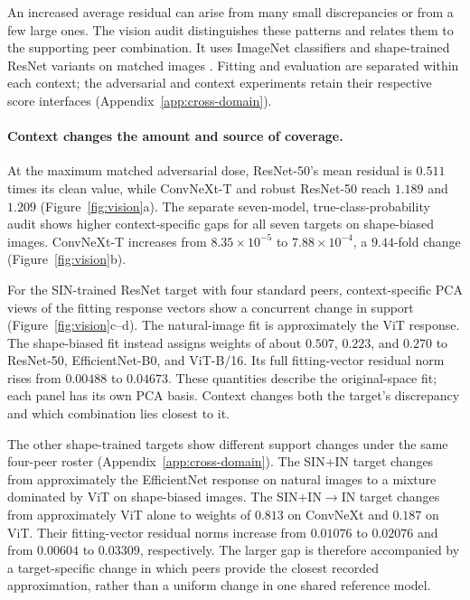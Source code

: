 An increased average residual can arise from many small discrepancies or from a few large ones. The vision audit distinguishes these patterns and relates them to the supporting peer combination. It uses ImageNet classifiers and shape-trained ResNet variants on matched images \citep{deng2009imagenet,he2016resnet,geirhos2019texture}. Fitting and evaluation are separated within each context; the adversarial and context experiments retain their respective score interfaces (Appendix~\ref{app:cross-domain}).

\paragraph{Context changes the amount and source of coverage.}
At the maximum matched adversarial dose, ResNet-50's mean residual is $0.511$ times its clean value, while ConvNeXt-T and robust ResNet-50 reach $1.189$ and $1.209$ (Figure~\ref{fig:vision}a). The separate seven-model, true-class-probability audit shows higher context-specific gaps for all seven targets on shape-biased images. ConvNeXt-T increases from $8.35\times10^{-5}$ to $7.88\times10^{-4}$, a $9.44$-fold change (Figure~\ref{fig:vision}b).

For the SIN-trained ResNet target with four standard peers, context-specific PCA views of the fitting response vectors show a concurrent change in support (Figure~\ref{fig:vision}c--d). The natural-image fit is approximately the ViT response. The shape-biased fit instead assigns weights of about $0.507$, $0.223$, and $0.270$ to ResNet-50, EfficientNet-B0, and ViT-B/16. Its full fitting-vector residual norm rises from $0.00488$ to $0.04673$. These quantities describe the original-space fit; each panel has its own PCA basis. Context changes both the target's discrepancy and which combination lies closest to it.



The other shape-trained targets show different support changes under the same four-peer roster (Appendix~\ref{app:cross-domain}). The SIN+IN target changes from approximately the EfficientNet response on natural images to a mixture dominated by ViT on shape-biased images. The SIN+IN$\to$IN target changes from approximately ViT alone to weights of $0.813$ on ConvNeXt and $0.187$ on ViT. Their fitting-vector residual norms increase from $0.01076$ to $0.02076$ and from $0.00604$ to $0.03309$, respectively. The larger gap is therefore accompanied by a target-specific change in which peers provide the closest recorded approximation, rather than a uniform change in one shared reference model.

